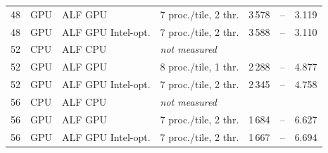 {\begin{tabular}{rlllrrr}
48 & GPU & ALF GPU & 7 proc./tile, 2 thr. & 3\,578 & -- & 3.119\\
48 & GPU & ALF GPU Intel-opt. & 7 proc./tile, 2 thr. & 3\,588 & -- & 3.110\\
\hline
52 & CPU & ALF CPU & \multicolumn{4}{l}{\emph{not measured}}\\
52 & GPU & ALF GPU & 8 proc./tile, 1 thr. & 2\,288 & -- & 4.877\\
52 & GPU & ALF GPU Intel-opt. & 7 proc./tile, 2 thr. & 2\,345 & -- & 4.758\\
\hline
56 & CPU & ALF CPU & \multicolumn{4}{l}{\emph{not measured}}\\
56 & GPU & ALF GPU & 7 proc./tile, 2 thr. & 1\,684 & -- & 6.627\\
56 & GPU & ALF GPU Intel-opt. & 7 proc./tile, 2 thr. & 1\,667 & -- & 6.694\\
\end{tabular}}
\newcommand{\FacExtrL}{56}\newcommand{\FacExtr}{16}\newcommand{\FacExtrBase}{16}\newcommand{\CpuExp}{6}
\newcommand{\FacExtrList}{12$\times$ ($L=44$), 14$\times$ ($L=48$), 15$\times$ ($L=52$), 16$\times$ ($L=56$)}
